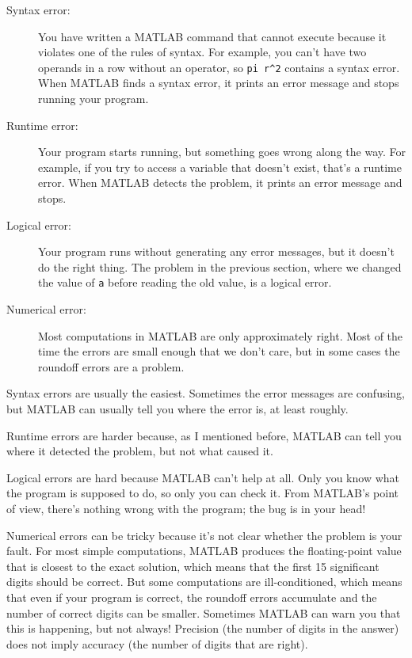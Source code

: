 \documentclass[
]{book}
\begin{document}
\begin{description}

\item[Syntax error:] You have written a MATLAB command that cannot
execute because it violates one of the rules of syntax.  For example,
you can't have two operands in a row without an operator, so
\verb+pi r^2+ contains a syntax error.  When MATLAB finds a syntax
error, it prints an error message and stops running your program.

\item[Runtime error:] Your program starts running, but something goes
wrong along the way.  For example, if you try to access a variable
that doesn't exist, that's a runtime error.  When MATLAB detects the
problem, it prints an error message and stops.

\item[Logical error:] Your program runs without generating any error
messages, but it doesn't do the right thing.  The problem in the
previous section, where we changed the value of {\tt a} before
reading the old value, is a logical error.

\item[Numerical error:] Most computations in MATLAB are only
approximately right.  Most of the time the errors are small enough
that we don't care, but in some cases the roundoff errors are a problem.

\end{description}

Syntax errors are usually the easiest.  Sometimes the error messages
are confusing, but MATLAB can usually tell you where the error is, at
least roughly.

Runtime errors are harder because, as I mentioned before, MATLAB
can tell you where it detected the problem, but not what caused it.

Logical errors are hard because MATLAB can't help at all.  Only you
know what the program is supposed to do, so only you can check it.
From MATLAB's point of view, there's nothing wrong with the program;
the bug is in your head!

Numerical errors can be tricky because it's not clear whether the
problem is your fault.  For most simple computations, MATLAB produces
the floating-point value that is closest to the exact solution, which
means that the first 15 significant digits should be correct.  But some
computations are ill-conditioned, which means that even if your program
is correct, the roundoff errors accumulate and the number of correct
digits can be smaller.  Sometimes MATLAB can warn you that
this is happening, but not always!  Precision (the number of digits
in the answer) does not imply accuracy (the number of digits that
are right).
\end{document}
